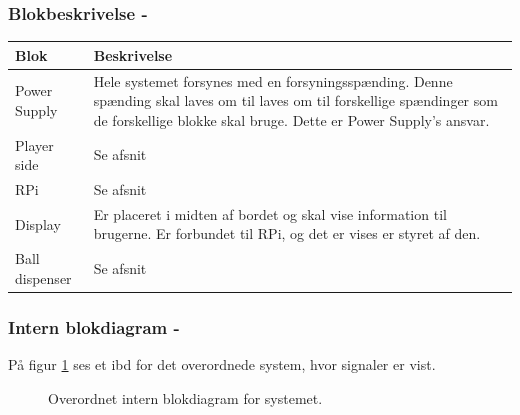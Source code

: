 \documentclass[Arkitektur/System_main.tex]{subfiles}
\begin{document}
\subsubsection{Blokbeskrivelse - }

\begin{table}[H]
\begin{tabular}{L{0.2\columnwidth}|L{0.8\columnwidth}}
\hline
\textbf{Blok} & \textbf{Beskrivelse} \\ \hline
Power Supply & Hele systemet forsynes med en forsyningsspænding. Denne spænding skal laves om til laves om til forskellige spændinger som de forskellige blokke skal bruge. Dette er Power Supply's ansvar.\\ \hline
Player side & Se afsnit \textit{} \\ \hline
RPi & Se afsnit \textit{}  \\ \hline
Display & Er placeret i midten af bordet og skal vise information til brugerne. Er forbundet til RPi, og det er vises er styret af den. \\ \hline
Ball dispenser & Se afsnit \textit{}   \\ \hline
\end{tabular}
\end{table}

\subsubsection{Intern blokdiagram - }

På figur \ref{fig:overall_hardware_ibd} ses et ibd for det overordnede system, hvor signaler er vist.

\begin{figure}[H]
    \centering
    \caption{Overordnet intern blokdiagram for systemet.}
    \label{fig:overall_hardware_ibd}
\end{figure}
\end{document}
